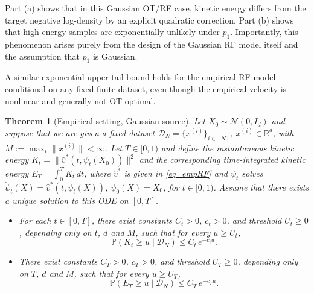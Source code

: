 \documentclass[a4paper,11pt]{article}
\newcommand{\R}{\mathbb{R}}
\theoremstyle{plain}
\newtheorem{theoreminner}{Theorem}[section]
\theoremstyle{definition}
\newtheorem{remark}{Remark}[section]
\newenvironment{theorem}[1][]
  {\begin{mdframed}[style=theoremstyle]\begin{theoreminner}[#1]}
  {\end{theoreminner}\end{mdframed}}
\begin{document}
Part (a) shows that in this Gaussian OT/RF case, kinetic energy differs from the target negative log-density by an explicit quadratic correction. Part (b) shows that high-energy samples are exponentially unlikely under \(p_1\). Importantly, this phenomenon arises purely from the design of the Gaussian RF model itself and the assumption that $p_1$ is Gaussian.



A similar exponential upper-tail bound holds for the empirical RF model
conditional on any fixed finite dataset, even though the empirical velocity is
nonlinear and generally not OT-optimal.

\begin{theorem}[Empirical setting, Gaussian source] \label{thm1}
Let $X_0 \sim \mathcal{N}(0, I_d)$ and suppose that we are given a fixed dataset $\mathcal{D}_N = \{x^{(i)}\}_{i \in [N]}$, $x^{(i)} \in \R^d$, with $M := \max_i \|x^{(i)}\| < \infty$.
Let $T \in [0,1)$ and define the instantaneous kinetic energy $K_t = \|\hat{v}^*(t, \psi_t(X_0))\|^2$ and the corresponding time-integrated kinetic energy $E_T = \int_0^T K_t \, dt$, where $\hat{v}^*$ is given in \eqref{eq_empRF} and $\psi_t$ solves $\dot{\psi}_t(X) = \hat{v}^*(t, \psi_t(X))$, $\psi_0(X) = X_0$, for $t \in [0, 1)$. Assume that there exists a unique solution to this ODE on $[0,T]$.

    \begin{itemize}
        \item[(a)] For each $t \in [0, T]$, there exist constants $C_t>0$, $c_t>0$, and threshold $U_t\ge 0$, depending only on $t$, $d$ and $M$, such that for every $u \ge U_t$,
        $$\mathbb{P}(K_t \ge u \mid \mathcal{D}_N) \le C_t \, e^{-c_t u}. $$
        \item[(b)] There exist constants $C_T>0$, $c_T>0$, and threshold  $U_T\ge 0$, depending only on $T$, $d$ and $M$, such that for every $u \ge U_T$,
        $$\mathbb{P}(E_T \ge u \mid \mathcal{D}_N) \le C_T \, e^{-c_T u}. $$
    \end{itemize} 
\end{theorem}
\end{document}
